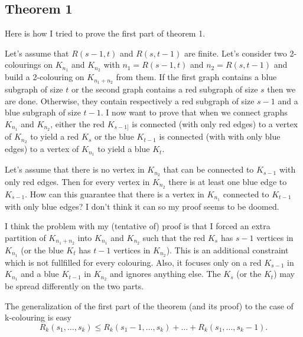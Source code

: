 \subsection{Theorem 1}

Here is how I tried to prove the first part of theorem 1.

Let's assume that $R(s-1,t)$ and $R(s,t-1)$ are finite. Let's consider two 2-colourings on $K_{n_1}$ and $K_{n_2}$ with $n_1 = R(s-1,t)$ and $n_2 = R(s,t-1)$ and build a 2-colouring on $K_{n_1 + n_2}$ from them.
If the first graph contains a blue subgraph of size $t$ or the second graph contains a red subgraph of size $s$ then we are done.
Otherwise, they contain respectively a red subgraph of size $s-1$ and a blue subgraph of size $t-1$.
I now want to prove that when we connect graphs $K_{n_1}$ and $K_{n_2}$,
either the red $K_{s-1]}$ is connected (with only red edges) to a vertex of $K_{n_2}$ to yield a red $K_s$
or the blue $K_{t-1}$ is connected (with with only blue edges) to a vertex of $K_{n_1}$ to yield a blue $K_t$.

Let's assume that there is no vertex in $K_{n_2}$ that can be connected to $K_{s-1}$ with only red edges.
Then for every vertex in $K_{n_2}$ there is at least one blue edge to $K_{s-1}$.
How can this guarantee that there is a vertex in $K_{n_1}$ connected to $K_{t-1}$ with only blue edges?
I don't think it can so my proof seems to be doomed.

I think the problem with my (tentative of) proof is that I forced an extra partition of $K_{n_1+n_2}$ into $K_{n_1}$ and $K_{n_2}$
such that the red $K_s$ has $s-1$ vertices in $K_{n_1}$ (or the blue $K_t$ has $t-1$ vertices in $K_{n_2}$).
This is an additional constraint which is not fullfilled for every colouring.
Also, it focuses only on a red $K_{s-1}$ in $K_{n_1}$ and a blue $K_{t-1}$ in $K_{n_2}$ and ignores anything else.
The $K_s$ (or the $K_t$) may be spread differently on the two parts.

\medskip

The generalization of the first part of the theorem (and its proof) to the case of k-colouring is easy
\begin{equation}
    \label{eq:generalRamseyUpperBound}
    R_k(s_1,\dots,s_k) \leq R_k(s_1-1,\dots,s_k) + \dots + R_k(s_1,\dots,s_k-1) .
\end{equation}


